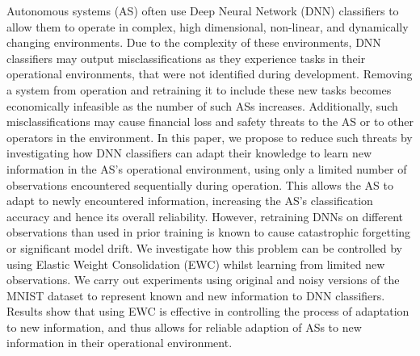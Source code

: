 Autonomous systems (AS) often use Deep Neural Network (DNN) classifiers to allow them to operate in complex, high dimensional, non-linear, and dynamically changing environments.
%
Due to the complexity of these environments, DNN classifiers may output misclassifications as they experience tasks in their operational environments, that were not identified during development.
%
Removing a system from operation and retraining it to include these new tasks 
becomes economically infeasible as the number of such ASs increases. 
%
Additionally, such misclassifications may cause financial loss and safety threats to the AS or to other operators in the environment.
%
In this paper, we propose to reduce such threats by investigating how DNN classifiers can adapt their knowledge to learn new information in the AS's operational environment, using only a limited number of observations encountered sequentially during operation. 
%
This allows the AS to adapt to newly encountered information, increasing the AS's classification accuracy and hence its overall reliability. %
%
However, retraining DNNs on different observations than used in prior training is known to cause catastrophic forgetting or significant model drift. 
%
We investigate how this problem can be controlled by using Elastic Weight Consolidation (EWC) whilst learning from limited new observations. %
%
We carry out experiments using original and noisy versions of the MNIST dataset to represent known and new information to DNN classifiers.
%
Results show that using EWC is effective in controlling the process of adaptation to new information, and thus allows for reliable adaption of ASs to new information in their operational environment.